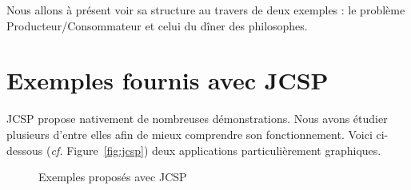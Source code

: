 \documentclass[a4paper,11pt,french]{report}
\begin{document}
Nous allons à présent voir sa structure au travers de deux exemples : le problème Producteur/Consommateur et celui du dîner des philosophes.

\section{Exemples fournis avec JCSP}

JCSP propose nativement de nombreuses démonstrations. Nous avons étudier plusieurs d'entre elles afin de mieux comprendre son fonctionnement. Voici ci-dessous (\emph{cf.} Figure~\vref{fig:jcsp}) deux applications particulièrement graphiques.

\begin{figure}[htp]
  \centering
  \vspace{1pt}               
  \caption{Exemples proposés avec JCSP}
  \label{fig:jcsp}
\end{figure}
\end{document}
